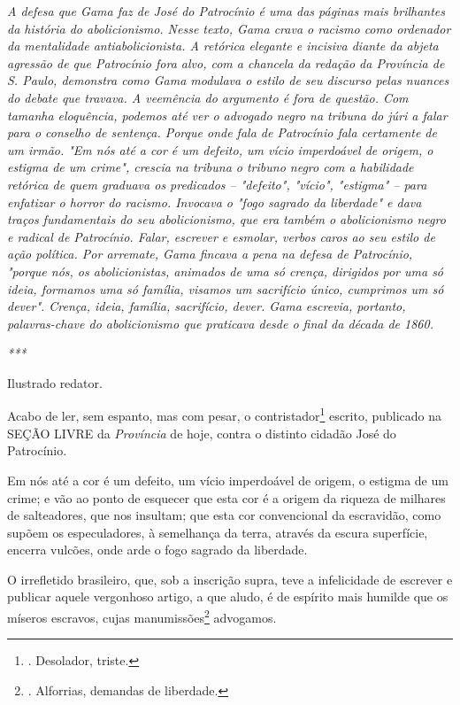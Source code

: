 \emph{A defesa que Gama faz de José do Patrocínio é uma das páginas mais
brilhantes da história do abolicionismo. Nesse texto, Gama crava o
racismo como ordenador da mentalidade antiabolicionista. A retórica
elegante e incisiva diante da abjeta agressão de que Patrocínio fora
alvo, com a chancela da redação da Província de S. Paulo, demonstra como
Gama modulava o estilo de seu discurso pelas nuances do debate que
travava. A veemência do argumento é fora de questão. Com tamanha
eloquência, podemos até ver o advogado negro na tribuna do júri a falar
para o conselho de sentença. Porque onde fala de Patrocínio fala
certamente de um irmão. "Em nós até a cor é um defeito, um vício
imperdoável de origem, o estigma de um crime", crescia na tribuna o
tribuno negro com a habilidade retórica de quem graduava os predicados
-- "defeito", "vício", "estigma" -- para enfatizar o horror do racismo.
Invocava o "fogo sagrado da liberdade" e dava traços fundamentais do seu
abolicionismo, que era também o abolicionismo negro e radical de
Patrocínio. Falar, escrever e esmolar, verbos caros ao seu estilo de
ação política. Por arremate, Gama fincava a pena na defesa de
Patrocínio, "porque nós, os abolicionistas, animados de uma só crença,
dirigidos por uma só ideia, formamos uma só família, visamos um
sacrifício único, cumprimos um só dever". Crença, ideia, família,
sacrifício, dever. Gama escrevia, portanto, palavras-chave do
abolicionismo que praticava desde o final da década de 1860. }

\emph{***}

Ilustrado redator.

Acabo de ler, sem espanto, mas com pesar, o contristador\footnote{.
  Desolador, triste.} escrito, publicado na SEÇÃO LIVRE da
\emph{Província} de hoje, contra o distinto cidadão José do Patrocínio.

Em nós até a cor é um defeito, um vício imperdoável de origem, o estigma
de um crime; e vão ao ponto de esquecer que esta cor é a origem da
riqueza de milhares de salteadores, que nos insultam; que esta cor
convencional da escravidão, como supõem os especuladores, à semelhança
da terra, através da escura superfície, encerra vulcões, onde arde o
fogo sagrado da liberdade.

O irrefletido brasileiro, que, sob a inscrição supra, teve a
infelicidade de escrever e publicar aquele vergonhoso artigo, a que
aludo, é de espírito mais humilde que os míseros escravos, cujas
manumissões\footnote{. Alforrias, demandas de liberdade.} advogamos.

